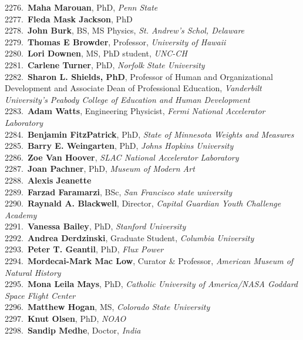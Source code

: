 2276.~{\bf Maha Marouan}, PhD, {\sl Penn State} \\
2277.~{\bf Fleda Mask Jackson}, PhD \\
2278.~{\bf John Burk}, BS, MS Physics, {\sl St. Andrew's Schol, Delaware} \\
2279.~{\bf Thomas E Browder}, Professor, {\sl University of Hawaii} \\
2280.~{\bf Lori Downen}, MS, PhD student, {\sl UNC-CH} \\
2281.~{\bf Carlene Turner}, PhD, {\sl Norfolk State University} \\
2282.~{\bf Sharon L. Shields, PhD}, Professor of Human and Organizational Development and Associate Dean of Professional Education, {\sl Vanderbilt University's Peabody College of Education and Human Development} \\
2283.~{\bf Adam Watts}, Engineering Physicist, {\sl Fermi National Accelerator Laboratory} \\
2284.~{\bf Benjamin FitzPatrick}, PhD, {\sl State of Minnesota Weights and Measures} \\
2285.~{\bf Barry E. Weingarten}, PhD, {\sl Johns Hopkins University} \\
2286.~{\bf Zoe Van Hoover}, {\sl SLAC National Accelerator Laboratory} \\
2287.~{\bf Joan Pachner}, PhD, {\sl Museum of Modern Art} \\
2288.~{\bf Alexis Jeanette} \\
2289.~{\bf Farzad Faramarzi}, BSc, {\sl San Francisco state university } \\
2290.~{\bf Raynald A. Blackwell}, Director, {\sl Capital Guardian Youth Challenge Academy } \\
2291.~{\bf Vanessa Bailey}, PhD, {\sl Stanford University} \\
2292.~{\bf Andrea Derdzinski}, Graduate Student, {\sl Columbia University } \\
2293.~{\bf Peter T. Geantil}, PhD, {\sl Flux Power} \\
2294.~{\bf Mordecai-Mark Mac Low}, Curator \& Professor, {\sl American Museum of Natural History} \\
2295.~{\bf Mona Leila Mays}, PhD, {\sl Catholic University of America/NASA Goddard Space Flight Center} \\
2296.~{\bf Matthew Hogan}, MS, {\sl Colorado State University} \\
2297.~{\bf Knut Olsen}, PhD, {\sl NOAO} \\
2298.~{\bf Sandip Medhe}, Doctor, {\sl India } \\
